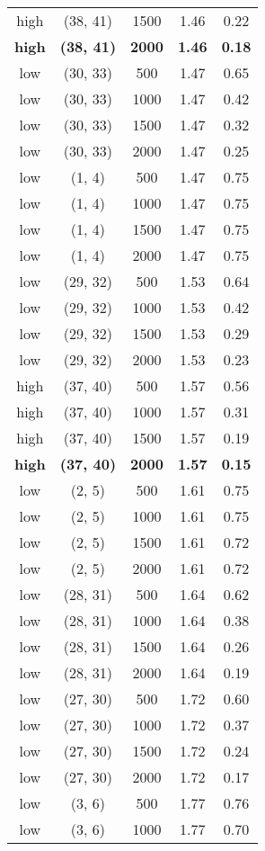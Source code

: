 \begin{tabular}{c c c c c}
high & (38, 41) &  1500 & 1.46 & 0.22 \\
\textbf{high} & \textbf{(38, 41)} & \textbf{ 2000} & \textbf{1.46} & \textbf{0.18} \\
low & (30, 33) &  500 & 1.47 & 0.65 \\
low & (30, 33) &  1000 & 1.47 & 0.42 \\
low & (30, 33) &  1500 & 1.47 & 0.32 \\
low & (30, 33) &  2000 & 1.47 & 0.25 \\
low & (1, 4) &  500 & 1.47 & 0.75 \\
low & (1, 4) &  1000 & 1.47 & 0.75 \\
low & (1, 4) &  1500 & 1.47 & 0.75 \\
low & (1, 4) &  2000 & 1.47 & 0.75 \\
low & (29, 32) &  500 & 1.53 & 0.64 \\
low & (29, 32) &  1000 & 1.53 & 0.42 \\
low & (29, 32) &  1500 & 1.53 & 0.29 \\
low & (29, 32) &  2000 & 1.53 & 0.23 \\
high & (37, 40) &  500 & 1.57 & 0.56 \\
high & (37, 40) &  1000 & 1.57 & 0.31 \\
high & (37, 40) &  1500 & 1.57 & 0.19 \\
\textbf{high} & \textbf{(37, 40)} & \textbf{ 2000} & \textbf{1.57} & \textbf{0.15} \\
low & (2, 5) &  500 & 1.61 & 0.75 \\
low & (2, 5) &  1000 & 1.61 & 0.75 \\
low & (2, 5) &  1500 & 1.61 & 0.72 \\
low & (2, 5) &  2000 & 1.61 & 0.72 \\
low & (28, 31) &  500 & 1.64 & 0.62 \\
low & (28, 31) &  1000 & 1.64 & 0.38 \\
low & (28, 31) &  1500 & 1.64 & 0.26 \\
low & (28, 31) &  2000 & 1.64 & 0.19 \\
low & (27, 30) &  500 & 1.72 & 0.60 \\
low & (27, 30) &  1000 & 1.72 & 0.37 \\
low & (27, 30) &  1500 & 1.72 & 0.24 \\
low & (27, 30) &  2000 & 1.72 & 0.17 \\
low & (3, 6) &  500 & 1.77 & 0.76 \\
low & (3, 6) &  1000 & 1.77 & 0.70 \\

\end{tabular}
